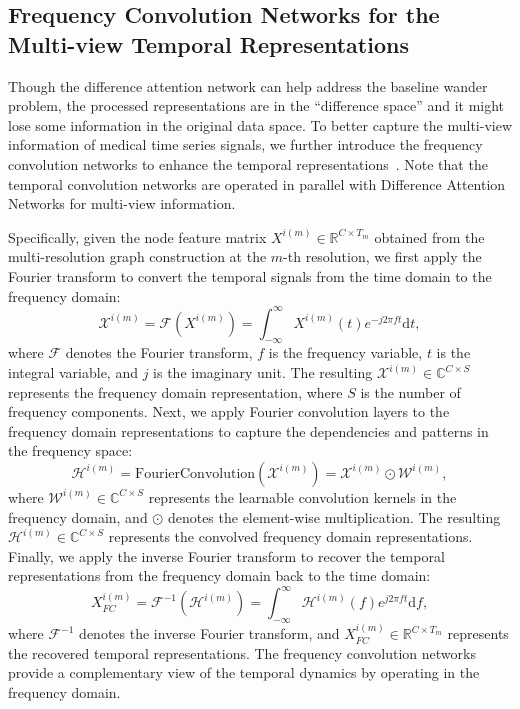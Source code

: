 \vspace{-2mm}
\subsection{Frequency Convolution Networks for the Multi-view Temporal Representations}\label{sec:3}

Though the difference attention network can help address the baseline wander problem, the processed representations are in the ``difference space'' and it might lose some information in the original data space. To better capture the multi-view information of medical time series signals, we further introduce the frequency convolution networks to enhance the temporal representations~\cite{yi2024frequency,fan2024deep,kunyi_2023survey,fan2022depts}. Note that the temporal convolution networks are operated in parallel with Difference Attention Networks for multi-view information. 

Specifically, given the node feature matrix ${X}^{i(m)} \in \mathbb{R}^{C \times T_m}$ obtained from the multi-resolution graph construction at the $m$-th resolution, we first apply the Fourier transform to convert the temporal signals from the time domain to the frequency domain:
\begin{equation}
\mathcal{X}^{i(m)} = \mathcal{F}({X}^{i(m)}) = \int_{-\infty}^{\infty} {X}^{i(m)}(t) e^{-j2\pi ft} \mathrm{d}t,
\end{equation}
where $\mathcal{F}$ denotes the Fourier transform, $f$ is the frequency variable, $t$ is the integral variable, and $j$ is the imaginary unit. The resulting $\mathcal{X}^{i(m)} \in \mathbb{C}^{C \times S}$ represents the frequency domain representation, where $S$ is the number of frequency components.
Next, we apply Fourier convolution layers to the frequency domain representations to capture the dependencies and patterns in the frequency space:
\begin{equation}
\mathcal{H}^{i(m)} = \text{FourierConvolution}(\mathcal{X}^{i(m)}) = \mathcal{X}^{i(m)} \odot \mathcal{W}^{i(m)},
\end{equation}
where $\mathcal{W}^{i(m)} \in \mathbb{C}^{C \times S}$ represents the learnable convolution kernels in the frequency domain, and $\odot$ denotes the element-wise multiplication.
The resulting $\mathcal{H}^{i(m)} \in \mathbb{C}^{C \times S}$ represents the convolved frequency domain representations.
Finally, we apply the inverse Fourier transform to recover the temporal representations from the frequency domain back to the time domain:
\begin{equation}
{X}^{i(m)}_{FC} = \mathcal{F}^{-1}(\mathcal{H}^{i(m)}) = \int_{-\infty}^{\infty} \mathcal{H}^{i(m)}(f) e^{j2\pi ft} \mathrm{d}f,
\end{equation}
where $\mathcal{F}^{-1}$ denotes the inverse Fourier transform, and ${X}^{i(m)}_{FC} \in \mathbb{R}^{C \times T_m}$ represents the recovered temporal representations.
The frequency convolution networks provide a complementary view of the temporal dynamics by operating in the frequency domain. 


